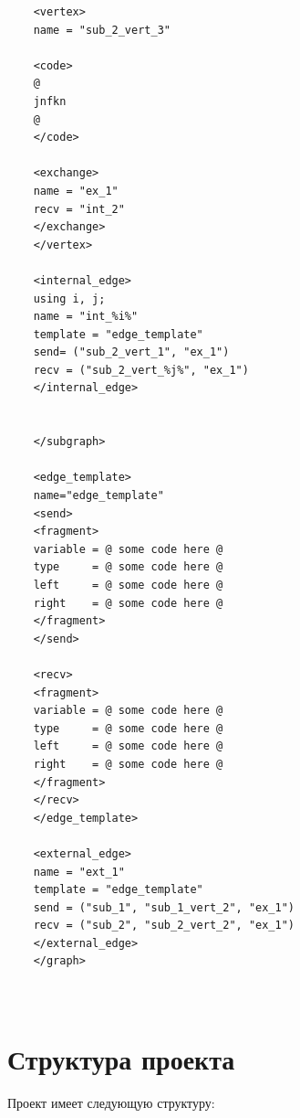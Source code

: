 \documentclass[a4paper, 12pt]{article}
\begin{document}
\begin{lstlisting}
	<vertex>
	name = "sub_2_vert_3"
	
	<code>
	@
	jnfkn
	@
	</code>
	
	<exchange>
	name = "ex_1"
	recv = "int_2"
	</exchange>
	</vertex>
	
	<internal_edge>
	using i, j;
	name = "int_%i%"
	template = "edge_template"
	send= ("sub_2_vert_1", "ex_1")
	recv = ("sub_2_vert_%j%", "ex_1")
	</internal_edge>
	
	
	</subgraph>
	
	<edge_template>
	name="edge_template"
	<send>   
	<fragment>
	variable = @ some code here @
	type     = @ some code here @
	left     = @ some code here @
	right    = @ some code here @
	</fragment>
	</send>
	
	<recv>
	<fragment>
	variable = @ some code here @
	type     = @ some code here @
	left     = @ some code here @
	right    = @ some code here @
	</fragment>
	</recv>
	</edge_template>
	
	<external_edge>
	name = "ext_1"
	template = "edge_template"
	send = ("sub_1", "sub_1_vert_2", "ex_1")
	recv = ("sub_2", "sub_2_vert_2", "ex_1")
	</external_edge>
	</graph>
	
	
	\end{lstlisting}
	
	\section{Структура проекта}
	
	Проект имеет следующую структуру:
	
\end{document}
